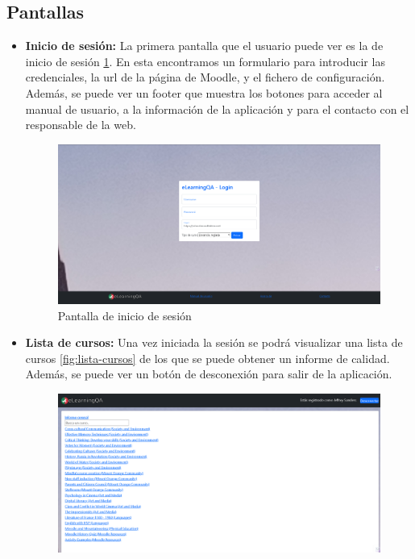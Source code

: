 \subsection{Pantallas}
    \begin{itemize}
        \item \textbf{Inicio de sesión:} La primera pantalla que el usuario puede ver es la de inicio de sesión \ref{fig:pantalla-inicio}. En esta encontramos un formulario para introducir las credenciales, la url de la página de Moodle, y el fichero de configuración.
        Además, se puede ver un footer que muestra los botones para acceder al manual de usuario, a la información de la aplicación y para el contacto con el responsable de la web.
        \begin{figure}[H]
            \centering
            \includegraphics[width=1\linewidth]{img/incio-sesion.png}
            \caption{Pantalla de inicio de sesión}
            \label{fig:pantalla-inicio}
        \end{figure}
        \item \textbf{Lista de cursos:} Una vez iniciada la sesión se podrá visualizar una lista de cursos \ref{fig:lista-cursos} de los que se puede obtener un informe de calidad. Además, se puede ver un botón de desconexión para salir de la aplicación.
        \begin{figure}[H]
            \centering
            \includegraphics[width=1\linewidth]{img/lista-cursos.png}

\end{figure}
\end{itemize}
